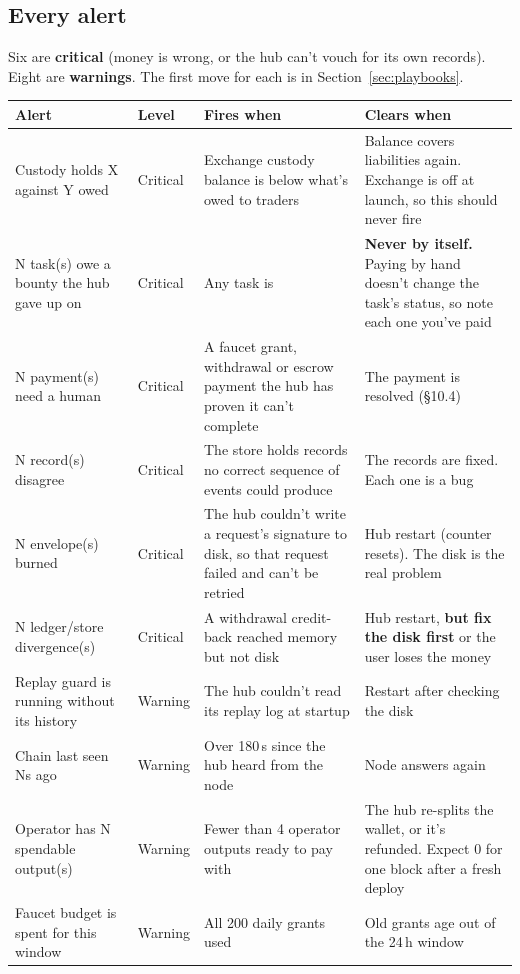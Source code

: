 \documentclass[11pt]{article}
\begin{document}
\subsection{Every alert}

Six are \textbf{critical} (money is wrong, or the hub can't vouch for its own records). Eight are \textbf{warnings}. The first move for each is in Section~\ref{sec:playbooks}.

\begingroup\small
\begin{longtable}{@{}L{4.1cm}L{1.5cm}L{5cm}L{4.6cm}@{}}
\toprule
\textbf{Alert} & \textbf{Level} & \textbf{Fires when} & \textbf{Clears when} \\
\midrule
\endhead
Custody holds X against Y owed & Critical & Exchange custody balance is below what's owed to traders & Balance covers liabilities again. Exchange is off at launch, so this should never fire \\
N task(s) owe a bounty the hub gave up on & Critical & Any task is  & \textbf{Never by itself.} Paying by hand doesn't change the task's status, so note each one you've paid \\
N payment(s) need a human & Critical & A faucet grant, withdrawal or escrow payment the hub has proven it can't complete & The payment is resolved (\S10.4) \\
N record(s) disagree & Critical & The store holds records no correct sequence of events could produce & The records are fixed. Each one is a bug \\
N envelope(s) burned & Critical & The hub couldn't write a request's signature to disk, so that request failed and can't be retried & Hub restart (counter resets). The disk is the real problem \\
N ledger/store divergence(s) & Critical & A withdrawal credit-back reached memory but not disk & Hub restart, \textbf{but fix the disk first} or the user loses the money \\
Replay guard is running without its history & Warning & The hub couldn't read its replay log at startup & Restart after checking the disk \\
Chain last seen Ns ago & Warning & Over 180\,s since the hub heard from the node & Node answers again \\
Operator has N spendable output(s) & Warning & Fewer than 4 operator outputs ready to pay with & The hub re-splits the wallet, or it's refunded. Expect 0 for one block after a fresh deploy \\
Faucet budget is spent for this window & Warning & All 200 daily grants used & Old grants age out of the 24\,h window \\

\end{longtable}
\end{document}
